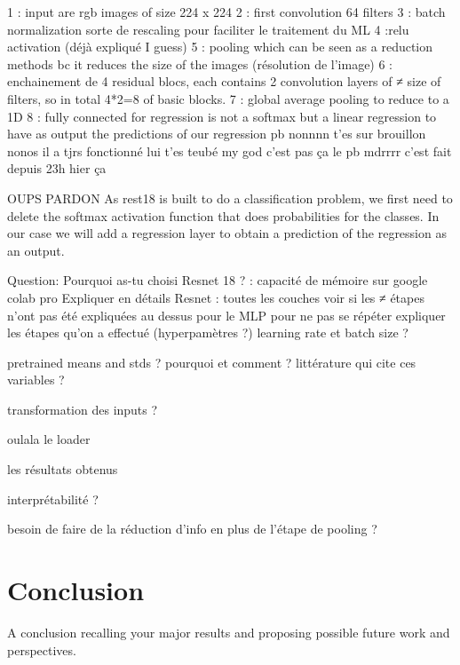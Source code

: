 \documentclass[12pt]{article}
\begin{document}
1 : input are rgb images of size 224 x 224
2 : first convolution 64 filters
3 : batch normalization sorte de rescaling pour faciliter le traitement du ML
4 :relu activation (déjà expliqué I guess)
5 : pooling which can be seen as a reduction methods bc it reduces the size of the images (résolution de l'image)
6 : enchainement de 4 residual blocs, each contains 2 convolution layers of ≠ size of filters, so in total 4*2=8 of basic blocks.
7 : global average pooling to reduce to a 1D
8 : fully connected for regression is not a softmax but a linear regression to have as output the predictions of our regression pb
nonnnn
t'es sur brouillon nonos
il a tjrs fonctionné lui
t'es teubé
my god
c'est pas ça le pb
mdrrrr
c'est fait depuis 23h hier ça

OUPS
PARDON
As rest18 is built to do a classification problem, we first need to delete the softmax activation function that does probabilities for the classes. In our case we will add a regression layer to obtain a prediction of the regression as an output. 

Question: 
Pourquoi as-tu choisi Resnet 18 ? : capacité de mémoire sur google colab pro
Expliquer en détails Resnet : toutes les couches
voir si les ≠ étapes n'ont pas été expliquées au dessus pour le MLP pour ne pas se répéter
expliquer les étapes qu'on a effectué (hyperpamètres ?)
learning rate et batch size ?

pretrained means and stds ? pourquoi et comment ? littérature qui cite ces variables ?

transformation des inputs ?

oulala le loader

les résultats obtenus

interprétabilité ?

besoin de faire de la réduction d'info en plus de l'étape de pooling ?





\section{Conclusion}
A conclusion recalling your major results and proposing possible future work and perspectives.
\end{document}
